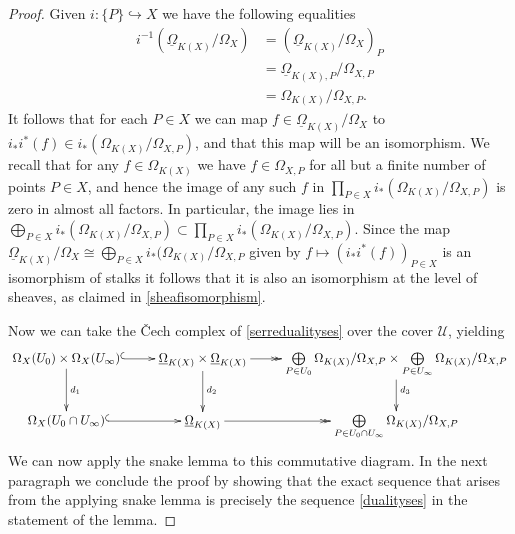 \documentclass[draft, 11pt]{article} %
\theoremstyle{plain}
\theoremstyle{remark}
\newcommand{\cU}{{\mathcal U}}
\newcommand{\cech}{\v{C}ech }
\begin{document}
\begin{proof}
Given $i\colon \{P\} \hookrightarrow X$ we have the following equalities
\begin{align*}
i^{-1}\left(\underline{\Omega}_{K(X)}/\Omega_X\right) & = \left(\underline{\Omega}_{K(X)}/\Omega_X\right)_P \\
& = \underline{\Omega}_{K(X),P}/\Omega_{X,P} \\
& = \Omega_{K(X)}/\Omega_{X,P}.
\end{align*}
It follows that for each $P\in X$ we can map $f \in \underline{\Omega}_{K(X)}/\Omega_X$ to $i_*i^*(f) \in i_*\left( \Omega_{K(X)}/\Omega_{X,P}\right)$, and that this map will be an isomorphism.
We recall that for any $f \in \Omega_{K(X)}$ we have $f \in \Omega_{X,P}$  for all but a finite number of points $P \in X$, and hence the image of any such $f$ in $\prod_{P\in X} i_*\left( \Omega_{K(X)}/\Omega_{X,P}\right)$ is zero in almost all factors.
In particular, the image lies in $\bigoplus_{P \in X} i_*(\Omega_{K(X)}/\Omega_{X,P} ) \subset \prod_{P\in X} i_*\left( \Omega_{K(X)}/\Omega_{X,P}\right)$.
Since the map $\underline{\Omega}_{K(X)}/\Omega_X \cong \bigoplus_{P \in X}i_*(\Omega_{K(X)}/\Omega_{X,P}$ given by $f \mapsto (i_*i^*(f))_{P \in X}$ is an isomorphism of stalks it follows that it is also an isomorphism at the level of sheaves, as claimed in \eqref{sheafisomorphism}.


Now we can take the \cech complex of \eqref{serredualityses} over the cover $\cU$, yielding
\begin{equation}\label{dualitydiagram2}
\xymatrix{\Omega_X(U_0)\times\Omega_X(U_\infty) \ar@{^{(}->}[r] \ar[d]^{d_1} & \underline{\Omega}_{K(X)} \times \underline{\Omega}_{K(X)} \ar[d]^{d_2} \ar@{->>}[r] & \bigoplus \limits_{P \in U_0} \Omega_{K(X)}/\Omega_{X,P} \times \bigoplus \limits_{P \in U_\infty} \Omega_{K(X)}/\Omega_{X,P} \ar[d]^{d_3} \\
\Omega_X(U_0 \cap U_\infty) \ar@{^{(}->}[r]  & \underline{\Omega}_{K(X)} \ar@{->>}[r] & \bigoplus \limits_{P\in U_0 \cap U_\infty} \Omega_{K(X)}/\Omega_{X,P} }
\end{equation}
We can now apply the snake lemma to this commutative diagram.
In the next paragraph we conclude the proof by showing that the exact sequence that arises from the applying snake lemma is precisely the sequence \eqref{dualityses} in the statement of the lemma.


\end{proof}
\end{document}
